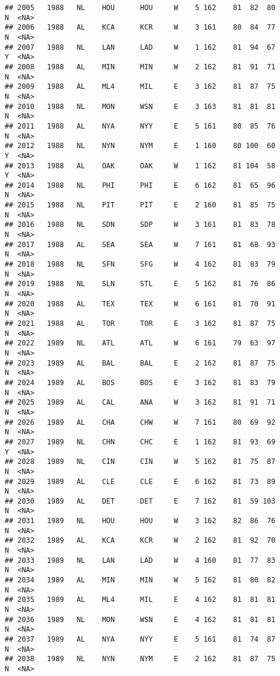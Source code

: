 \documentclass[]{article}
\begin{document}
\begin{verbatim}
## 2005   1988   NL    HOU      HOU     W    5 162    81  82  80      N  <NA>
## 2006   1988   AL    KCA      KCR     W    3 161    80  84  77      N  <NA>
## 2007   1988   NL    LAN      LAD     W    1 162    81  94  67      Y  <NA>
## 2008   1988   AL    MIN      MIN     W    2 162    81  91  71      N  <NA>
## 2009   1988   AL    ML4      MIL     E    3 162    81  87  75      N  <NA>
## 2010   1988   NL    MON      WSN     E    3 163    81  81  81      N  <NA>
## 2011   1988   AL    NYA      NYY     E    5 161    80  85  76      N  <NA>
## 2012   1988   NL    NYN      NYM     E    1 160    80 100  60      Y  <NA>
## 2013   1988   AL    OAK      OAK     W    1 162    81 104  58      Y  <NA>
## 2014   1988   NL    PHI      PHI     E    6 162    81  65  96      N  <NA>
## 2015   1988   NL    PIT      PIT     E    2 160    81  85  75      N  <NA>
## 2016   1988   NL    SDN      SDP     W    3 161    81  83  78      N  <NA>
## 2017   1988   AL    SEA      SEA     W    7 161    81  68  93      N  <NA>
## 2018   1988   NL    SFN      SFG     W    4 162    81  83  79      N  <NA>
## 2019   1988   NL    SLN      STL     E    5 162    81  76  86      N  <NA>
## 2020   1988   AL    TEX      TEX     W    6 161    81  70  91      N  <NA>
## 2021   1988   AL    TOR      TOR     E    3 162    81  87  75      N  <NA>
## 2022   1989   NL    ATL      ATL     W    6 161    79  63  97      N  <NA>
## 2023   1989   AL    BAL      BAL     E    2 162    81  87  75      N  <NA>
## 2024   1989   AL    BOS      BOS     E    3 162    81  83  79      N  <NA>
## 2025   1989   AL    CAL      ANA     W    3 162    81  91  71      N  <NA>
## 2026   1989   AL    CHA      CHW     W    7 161    80  69  92      N  <NA>
## 2027   1989   NL    CHN      CHC     E    1 162    81  93  69      Y  <NA>
## 2028   1989   NL    CIN      CIN     W    5 162    81  75  87      N  <NA>
## 2029   1989   AL    CLE      CLE     E    6 162    81  73  89      N  <NA>
## 2030   1989   AL    DET      DET     E    7 162    81  59 103      N  <NA>
## 2031   1989   NL    HOU      HOU     W    3 162    82  86  76      N  <NA>
## 2032   1989   AL    KCA      KCR     W    2 162    81  92  70      N  <NA>
## 2033   1989   NL    LAN      LAD     W    4 160    81  77  83      N  <NA>
## 2034   1989   AL    MIN      MIN     W    5 162    81  80  82      N  <NA>
## 2035   1989   AL    ML4      MIL     E    4 162    81  81  81      N  <NA>
## 2036   1989   NL    MON      WSN     E    4 162    81  81  81      N  <NA>
## 2037   1989   AL    NYA      NYY     E    5 161    81  74  87      N  <NA>
## 2038   1989   NL    NYN      NYM     E    2 162    81  87  75      N  <NA>

\end{verbatim}
\end{document}
